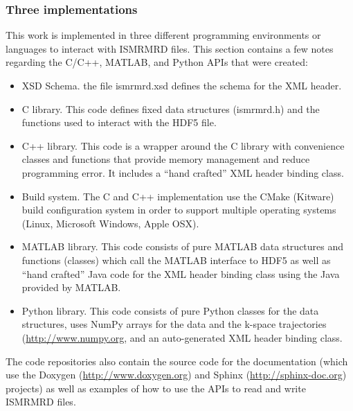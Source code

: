 \documentclass[12pt]{article}
\begin{document}
\subsubsection*{Three implementations}
This work is implemented in three different programming environments or languages to interact with ISMRMRD files. This section contains a few notes regarding the C/C++, MATLAB, and Python APIs that were created:
\begin{itemize}
\item{XSD Schema.} the file ismrmrd.xsd defines the schema for the XML header.
\item{C library.}  This code defines fixed data structures (ismrmrd.h) and the functions used to interact with the HDF5 file.
\item{C++ library.} This code is a wrapper around the C library with convenience classes and functions that provide memory management and reduce programming error.  It includes a ``hand crafted'' XML header binding class.  
\item{Build system.} The C and C++ implementation use the CMake (Kitware) build configuration system in order to support multiple operating systems (Linux, Microsoft Windows, Apple OSX).
\item{MATLAB library.} This code consists of pure MATLAB data structures and functions (classes) which call the MATLAB interface to HDF5 as well as ``hand crafted'' Java code for the XML header binding class using the Java provided by MATLAB.
\item{Python library.} This code consists of pure Python classes for the data structures, uses NumPy arrays for the data and the k-space trajectories (\url{http://www.numpy.org}, and an auto-generated XML header binding class.
\end{itemize}

The code repositories also contain the source code for the documentation (which use the Doxygen (\url{http://www.doxygen.org}) and Sphinx (\url{http://sphinx-doc.org}) projects) as well as examples of how to use the APIs to read and write ISMRMRD files.
\end{document}
